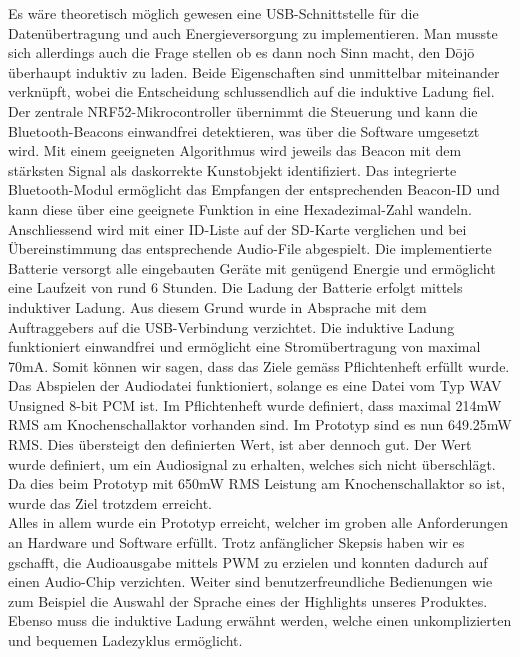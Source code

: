 Es wäre theoretisch möglich gewesen eine USB-Schnittstelle für die Datenübertragung und auch Energieversorgung zu implementieren. Man musste sich allerdings auch die Frage stellen ob es dann noch Sinn macht, den Dōjō überhaupt induktiv zu laden. Beide Eigenschaften sind unmittelbar miteinander verknüpft, wobei die Entscheidung schlussendlich auf die induktive Ladung fiel. Der zentrale NRF52-Mikrocontroller übernimmt die Steuerung und kann die Bluetooth-Beacons einwandfrei detektieren, was über die Software umgesetzt wird. Mit einem geeigneten Algorithmus wird jeweils das Beacon mit dem stärksten Signal als das{\glqq korrekte\grqq} Kunstobjekt identifiziert. Das integrierte Bluetooth-Modul ermöglicht das Empfangen der entsprechenden Beacon-ID und kann diese über eine geeignete Funktion in eine Hexadezimal-Zahl wandeln. Anschliessend wird mit einer ID-Liste auf der SD-Karte verglichen und bei Übereinstimmung das entsprechende Audio-File abgespielt. Die implementierte Batterie versorgt alle eingebauten Geräte mit genügend Energie und ermöglicht eine Laufzeit von rund 6 Stunden. Die Ladung der Batterie erfolgt mittels induktiver Ladung. Aus diesem Grund wurde in Absprache mit dem Auftraggebers auf die USB-Verbindung verzichtet. Die induktive Ladung funktioniert einwandfrei und ermöglicht eine Stromübertragung von maximal 70mA. Somit können wir sagen, dass das Ziele gemäss Pflichtenheft erfüllt wurde. Das Abspielen der Audiodatei funktioniert, solange es eine Datei vom Typ WAV Unsigned 8-bit PCM ist. Im Pflichtenheft wurde definiert, dass maximal 214mW RMS am Knochenschallaktor vorhanden sind. Im Prototyp sind es nun 649.25mW RMS. Dies übersteigt den definierten Wert, ist aber dennoch gut. Der Wert wurde definiert, um ein Audiosignal zu erhalten, welches sich nicht überschlägt. Da dies beim Prototyp mit 650mW RMS Leistung am Knochenschallaktor so ist, wurde das Ziel trotzdem erreicht.\\
Alles in allem wurde ein Prototyp erreicht, welcher im groben alle Anforderungen an Hardware und Software erfüllt. Trotz anfänglicher Skepsis haben wir es gschafft, die Audioausgabe mittels PWM zu erzielen und konnten dadurch auf einen Audio-Chip verzichten. Weiter sind benutzerfreundliche Bedienungen wie zum Beispiel die Auswahl der Sprache eines der Highlights unseres Produktes. Ebenso muss die induktive Ladung erwähnt werden, welche einen unkomplizierten und bequemen Ladezyklus ermöglicht.
 
